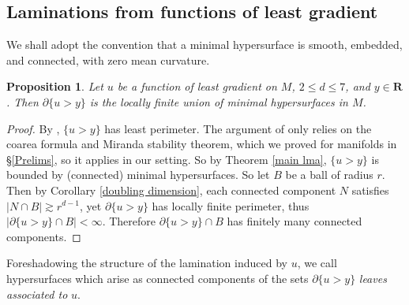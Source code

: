 \documentclass[reqno,10pt]{amsart}
\newcommand{\RR}{\mathbf{R}}
\newcommand{\dfn}[1]{\emph{#1}\index{#1}}
\newtheorem{proposition}[theorem]{Proposition}
\theoremstyle{definition}
\numberwithin{equation}{section}
\begin{document}


\subsection{Laminations from functions of least gradient}
We shall adopt the convention that a minimal hypersurface is smooth, embedded, and connected, with zero mean curvature.

\begin{proposition}
Let $u$ be a function of least gradient on $M$, $2 \leq d \leq 7$, and $y \in \RR$. Then $\partial \{u > y\}$ is the locally finite union of minimal hypersurfaces in $M$.
\end{proposition}
\begin{proof}
By \cite[Theorem 1]{BOMBIERI1969}, $\{u > y\}$ has least perimeter.
The argument of \cite{BOMBIERI1969} only relies on the coarea formula and Miranda stability theorem, which we proved for manifolds in \S\ref{Prelims}, so it applies in our setting.
So by Theorem \ref{main lma}, $\{u > y\}$ is bounded by (connected) minimal hypersurfaces.
So let $B$ be a ball of radius $r$. Then by Corollary \ref{doubling dimension}, each connected component $N$ satisfies $|N \cap B| \gtrsim r^{d - 1}$, yet $\partial \{u > y\}$ has locally finite perimeter, thus $|\partial \{u > y\} \cap B| < \infty$.
Therefore $\partial \{u > y\} \cap B$ has finitely many connected components.
\end{proof}

Foreshadowing the structure of the lamination induced by $u$, we call hypersurfaces which arise as connected components of the sets $\partial \{u > y\}$ \dfn{leaves associated to} $u$.
\end{document}
